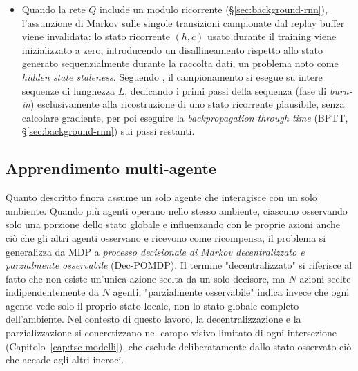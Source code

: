 \begin{itemize}
        il suo contributo cresce solo linearmente):
        \begin{equation}
          L_\delta(y, \hat y) =
          \begin{cases}
            \tfrac{1}{2}(y-\hat y)^2                           & \text{se } |y-\hat y| \le \delta \\
            \delta\left(|y-\hat y| - \tfrac{1}{2}\delta\right) & \text{altrimenti}
          \end{cases}
        \end{equation}
        Tipicamente $\delta = 1$.
  \item Quando la rete $Q$ include un modulo ricorrente
        (§\ref{sec:background-rnn}), l'assunzione di Markov sulle singole
        transizioni campionate dal replay buffer viene invalidata: lo stato
        ricorrente $(h,c)$ usato durante il training viene inizializzato a
        zero, introducendo un disallineamento rispetto allo stato generato
        sequenzialmente durante la raccolta dati, un problema noto come
        \emph{hidden state staleness}. Seguendo \citet{kapturowski2019r2d2}, il campionamento si esegue su
        intere sequenze di lunghezza $L$, dedicando i primi passi
        della sequenza (fase di \emph{burn-in}) esclusivamente alla ricostruzione di uno stato
        ricorrente plausibile, senza calcolare gradiente, per poi eseguire la
        \emph{backpropagation through time} (BPTT, §\ref{sec:background-rnn})
        sui passi restanti.
\end{itemize}

\subsection{Apprendimento multi-agente}
\label{subsec:marl}

Quanto descritto finora assume un solo agente che interagisce con
un solo ambiente. Quando più agenti operano nello stesso ambiente,
ciascuno osservando solo una porzione dello stato globale e influenzando
con le proprie azioni anche ciò che gli altri agenti osservano e
ricevono come ricompensa, il problema si generalizza da MDP a
\emph{processo decisionale di Markov decentralizzato e parzialmente
  osservabile} (Dec-POMDP). Il termine "decentralizzato" si riferisce al fatto che non esiste un'unica
azione scelta da un solo decisore, ma $N$ azioni scelte
indipendentemente da $N$ agenti; "parzialmente osservabile" indica invece che ogni
agente vede solo il proprio stato locale, non lo stato globale
completo dell'ambiente. Nel contesto di questo lavoro, la decentralizzazione e la parzializzazione
si concretizzano nel campo visivo limitato di ogni intersezione (Capitolo~\ref{cap:tsc-modelli}), che esclude deliberatamente
dallo stato osservato ciò che accade agli altri incroci.

